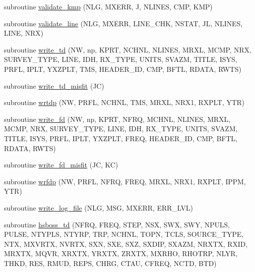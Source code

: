 \begin{DoxyCompactItemize}
\item 
subroutine \hyperlink{Leroi__c_8f90_a2cd90fa43f6deaeb4a86b02b8494d638}{validate\+\_\+kmp} (N\+LG, M\+X\+E\+RR, J, N\+L\+I\+N\+ES, C\+MP, K\+MP)
\item 
subroutine \hyperlink{Leroi__c_8f90_aac9f78ba0dc05544c1babba6dc4ac636}{validate\+\_\+line} (N\+LG, M\+X\+E\+RR, L\+I\+N\+E\+\_\+\+C\+HK, N\+S\+T\+AT, JL, N\+L\+I\+N\+ES, L\+I\+NE, N\+RX)
\item 
subroutine \hyperlink{Leroi__c_8f90_a050575d7cd77b6819922e9b6aa765af7}{write\+\_\+td} (NW, np, K\+P\+RT, N\+C\+H\+NL, N\+L\+I\+N\+ES, M\+R\+XL, M\+C\+MP, N\+RX, S\+U\+R\+V\+E\+Y\+\_\+\+T\+Y\+PE, L\+I\+NE, I\+DH, R\+X\+\_\+\+T\+Y\+PE, U\+N\+I\+TS, S\+V\+A\+ZM, T\+I\+T\+LE, I\+S\+YS, P\+R\+FL, I\+P\+LT, Y\+X\+Z\+P\+LT, T\+MS, H\+E\+A\+D\+E\+R\+\_\+\+ID, C\+MP, B\+F\+TL, R\+D\+A\+TA, R\+W\+TS)
\item 
subroutine \hyperlink{Leroi__c_8f90_ae92c690eb0a03d9faf58627a9777375f}{write\+\_\+td\+\_\+misfit} (JC)
\item 
subroutine \hyperlink{Leroi__c_8f90_a6dd9c54049a223ff90b461f73c11015a}{wrtdp} (NW, P\+R\+FL, N\+C\+H\+NL, T\+MS, M\+R\+XL, N\+R\+X1, R\+X\+P\+LT, Y\+TR)
\item 
subroutine \hyperlink{Leroi__c_8f90_ab3f62aa9d1d60322e81296cc809df15f}{write\+\_\+fd} (NW, np, K\+P\+RT, N\+F\+RQ, M\+C\+H\+NL, N\+L\+I\+N\+ES, M\+R\+XL, M\+C\+MP, N\+RX, S\+U\+R\+V\+E\+Y\+\_\+\+T\+Y\+PE, L\+I\+NE, I\+DH, R\+X\+\_\+\+T\+Y\+PE, U\+N\+I\+TS, S\+V\+A\+ZM, T\+I\+T\+LE, I\+S\+YS, P\+R\+FL, I\+P\+LT, Y\+X\+Z\+P\+LT, F\+R\+EQ, H\+E\+A\+D\+E\+R\+\_\+\+ID, C\+MP, B\+F\+TL, R\+D\+A\+TA, R\+W\+TS)
\item 
subroutine \hyperlink{Leroi__c_8f90_a099fdc373643714db817e823ef93b622}{write\+\_\+fd\+\_\+misfit} (JC, KC)
\item 
subroutine \hyperlink{Leroi__c_8f90_aa07d276404c70df8a716f8407fa09445}{wrfdp} (NW, P\+R\+FL, N\+F\+RQ, F\+R\+EQ, M\+R\+XL, N\+R\+X1, R\+X\+P\+LT, I\+P\+PM, Y\+TR)
\item 
subroutine \hyperlink{Leroi__c_8f90_a78d7005f266cbaf5c3ec23db494d00ba}{write\+\_\+log\+\_\+file} (N\+LG, M\+SG, M\+X\+E\+RR, E\+R\+R\+\_\+\+L\+VL)
\item 
subroutine \hyperlink{Leroi__c_8f90_a9b871caa6fa2f7ceadf6860a0a16a07b}{hsboss\+\_\+td} (N\+F\+RQ, F\+R\+EQ, S\+T\+EP, N\+SX, S\+WX, S\+WY, N\+P\+U\+LS, P\+U\+L\+SE, N\+T\+Y\+P\+LS, N\+T\+Y\+RP, T\+RP, N\+C\+H\+NL, T\+O\+PN, T\+C\+LS, S\+O\+U\+R\+C\+E\+\_\+\+T\+Y\+PE, N\+TX, M\+X\+V\+R\+TX, N\+V\+R\+TX, S\+XN, S\+XE, S\+XZ, S\+X\+D\+IP, S\+X\+A\+ZM, N\+R\+X\+TX, R\+X\+ID, M\+R\+X\+TX, M\+Q\+VR, X\+R\+X\+TX, Y\+R\+X\+TX, Z\+R\+X\+TX, M\+X\+R\+HO, R\+H\+O\+T\+RP, N\+L\+YR, T\+H\+KD, R\+ES, R\+M\+UD, R\+E\+PS, C\+H\+RG, C\+T\+AU, C\+F\+R\+EQ, N\+C\+TD, B\+TD)

\end{DoxyCompactItemize}
